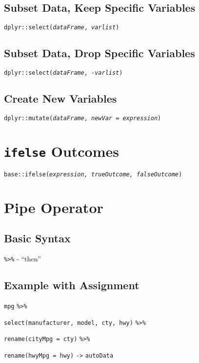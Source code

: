 \documentclass{tufte-handout}
\begin{document}
\vspace{3mm}
\subsection{Subset Data, Keep Specific Variables}
\texttt{dplyr::}{\color{red}\texttt{select}}\texttt{(\textit{dataFrame}, \textit{varlist})}

\vspace{3mm}
\subsection{Subset Data, Drop Specific Variables}
\texttt{dplyr::}{\color{red}\texttt{select}}\texttt{(\textit{dataFrame}, -\textit{varlist})}

\vspace{3mm}
\subsection{Create New Variables}
\texttt{dplyr::}{\color{red}\texttt{mutate}}\texttt{(\textit{dataFrame}, \textit{newVar} = \textit{expression})}

\vspace{5mm}
\section{\texttt{ifelse} Outcomes}
\texttt{base::}{\color{red}\texttt{ifelse}}\texttt{(\textit{expression, trueOutcome, falseOutcome})}

\newpage
\section{Pipe Operator}
\subsection{Basic Syntax}
 {\color{red}\texttt{\%>\%}} - ``then''
 
 \vspace{3mm}
 \subsection{Example with Assignment}
 \texttt{mpg} {\color{red}\texttt{\%>\%}}
 \par \noindent \hspace{5mm} {\color{red}\texttt{select}}\texttt{(manufacturer, model, cty, hwy)} {\color{red}\texttt{\%>\%}}
 \par \noindent \hspace{5mm} {\color{red}\texttt{rename}}\texttt{(cityMpg = cty)} {\color{red}\texttt{\%>\%}}
  \par \noindent \hspace{5mm} {\color{red}\texttt{rename}}\texttt{(hwyMpg = hwy)} {\color{red}\texttt{->}} \texttt{autoData}
\end{document}
